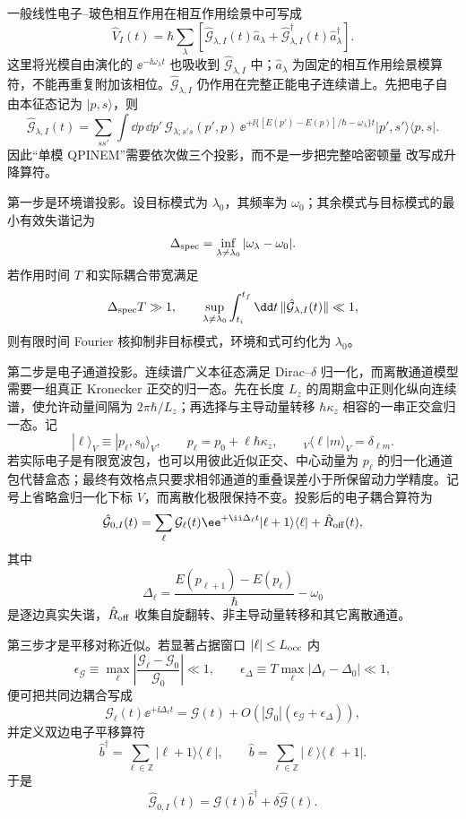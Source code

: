 \begin{derivation}[共振单模近场的量子耦合]

一般线性电子--玻色相互作用在相互作用绘景中可写成
\[
\hat V_I(t)
=
\hbar\sum_\lambda
\left[
\hat{\mathcal G}_{\lambda,I}(t)\hat a_\lambda
+
\hat{\mathcal G}_{\lambda,I}^\dagger(t)\hat a_\lambda^\dagger
\right].
\]
这里将光模自由演化的 $\ee^{-\ii\omega_\lambda t}$ 也吸收到 $\hat{\mathcal G}_{\lambda,I}$ 中；$\hat a_\lambda$ 为固定的相互作用绘景模算符，不能再重复附加该相位。$\hat{\mathcal G}_{\lambda,I}$ 仍作用在完整正能电子连续谱上。先把电子自由本征态记为 $|p,s\rangle$，则
\[
\hat{\mathcal G}_{\lambda,I}(t)
=
\sum_{ss'}\int\dd p\,\dd p'\,
\mathcal G_{\lambda;s's}(p',p)\,
\ee^{+\ii\{[E(p')-E(p)]/\hbar-\omega_\lambda\}t}
|p',s'\rangle\langle p,s|.
\]
因此“单模 QPINEM”需要依次做三个投影，而不是一步把完整哈密顿量 改写成升降算符。

第一步是环境谱投影。设目标模式为 $\lambda_0$，其频率为 $\omega_0$；其余模式与目标模式的最小有效失谐记为
\[
\Delta_{\rm spec}
=
\inf_{\lambda\neq\lambda_0}
|\omega_\lambda-\omega_0|.
\]
若作用时间 $T$ 和实际耦合带宽满足
\[
\Delta_{\rm spec}T\gg1,
\qquad
\sup_{\lambda\neq\lambda_0}
\int_{t_i}^{t_f}\dd t\,
\|\hat{\mathcal G}_{\lambda,I}(t)\|
\ll1,
\]
则有限时间 Fourier 核抑制非目标模式，环境和式可约化为 $\lambda_0$。

第二步是电子通道投影。连续谱广义本征态满足 Dirac--$\delta$ 归一化，而离散通道模型需要一组真正 Kronecker 正交的归一态。先在长度 $L_z$ 的周期盒中正则化纵向连续谱，使允许动量间隔为 $2\pi\hbar/L_z$；再选择与主导动量转移 $\hbar\kappa_z$ 相容的一串正交盒归一态。记
\[
|\ell\rangle_V
\equiv
|p_\ell,s_0\rangle_V,
\qquad
p_\ell=p_0+\ell\hbar\kappa_z,
\qquad
{}_V\langle\ell|m\rangle_V=\delta_{\ell m}.
\]
若实际电子是有限宽波包，也可以用彼此近似正交、中心动量为 $p_\ell$ 的归一化通道包代替盒态；最终有效格点只要求相邻通道的重叠误差小于所保留动力学精度。记号上省略盒归一化下标 $V$，而离散化极限保持不变。投影后的电子耦合算符为
\[
\hat{\mathcal G}_{0,I}(t)
=
\sum_\ell
\mathcal G_\ell(t)
\ee^{+\ii\Delta_\ell t}
|\ell+1\rangle\langle\ell|
+
\hat R_{\rm off}(t),
\]
其中
\[
\Delta_\ell
=
\frac{E(p_{\ell+1})-E(p_\ell)}{\hbar}
-\omega_0
\]
是逐边真实失谐，$\hat R_{\rm off}$ 收集自旋翻转、非主导动量转移和其它离散通道。

第三步才是平移对称近似。若显著占据窗口 $|\ell|\le L_{\rm occ}$ 内
\[
\epsilon_{\mathcal G}
\equiv
\max_\ell
\left|
\frac{\mathcal G_\ell-\mathcal G_0}{\mathcal G_0}
\right|
\ll1,
\qquad
\epsilon_\Delta
\equiv
T\max_\ell|\Delta_\ell-\Delta_0|
\ll1,
\]
便可把共同边耦合写成
\[
\mathcal G_\ell(t)\ee^{+\ii\Delta_\ell t}
=
\mathcal G(t)
+
O\!\left(|\mathcal G_0|(\epsilon_{\mathcal G}+\epsilon_\Delta)\right),
\]
并定义双边电子平移算符
\[
\hat b^\dagger
=
\sum_{\ell\in\mathbb Z}
|\ell+1\rangle\langle\ell|,
\qquad
\hat b
=
\sum_{\ell\in\mathbb Z}
|\ell\rangle\langle\ell+1|.
\]
于是
\[
\hat{\mathcal G}_{0,I}(t)
=
\mathcal G(t)\hat b^\dagger
+\delta\hat{\mathcal G}(t).
\]


\end{derivation}
